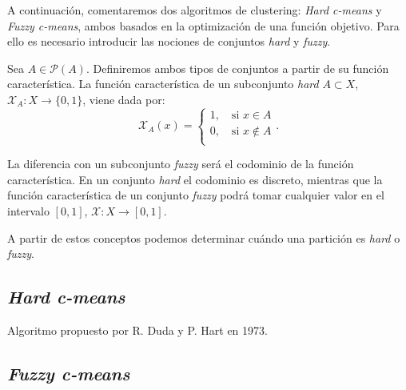 \documentclass[10pt,a4paper]{article} %
\theoremstyle{definition}
\begin{document}
    A continuación, comentaremos dos algoritmos de clustering: \textit{Hard c-means} y \textit{Fuzzy c-means}, ambos basados en la optimización de una función objetivo. Para ello es necesario introducir las nociones de conjuntos \textit{hard} y \textit{fuzzy}.

    Sea $A \in \mathcal{P}(A)$. Definiremos ambos tipos de conjuntos a partir de su función característica. La función característica de un subconjunto \textit{hard} $A \subset X$, $\mathcal{X}_A:X \to \{0,1\}$, viene dada por:
\[  
\mathcal{X}_A(x) = 
     \begin{cases}
       1, \quad\text{si } x \in A\\
       0, \quad\text{si } x \notin A \\ 
     \end{cases}.
\]

La diferencia con un subconjunto \textit{fuzzy} será el codominio de la función característica. En un conjunto \textit{hard} el codominio es discreto, mientras que la función característica de un conjunto \textit{fuzzy} podrá tomar cualquier valor en el intervalo $[0,1]$, $\mathcal{X}:X \to [0,1]$.

A partir de estos conceptos podemos determinar cuándo una partición es \textit{hard} o \textit{fuzzy}.


    
\subsection{\textit{Hard c-means}}
Algoritmo propuesto por R. Duda y P. Hart en 1973.
    
    \subsection{\textit{Fuzzy c-means}}
    
    \nocite{*}
    
    
\end{document}
